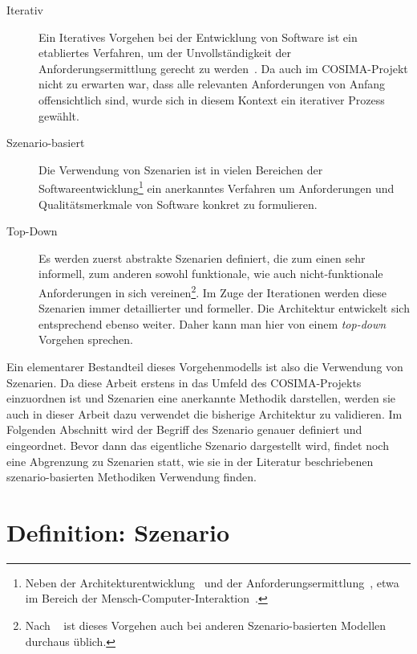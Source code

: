   \begin{description}
    \item[Iterativ] Ein Iteratives Vorgehen bei der Entwicklung von Software ist ein etabliertes Verfahren, um der Unvollständigkeit der Anforderungsermittlung gerecht zu werden~\citep{brooks1987nsb,basili2005iea,boehm1986sm,kruchten2003rup}. Da auch im COSIMA-Projekt nicht zu erwarten war, dass alle relevanten Anforderungen von Anfang offensichtlich sind, wurde sich in diesem Kontext ein iterativer Prozess gewählt.
    \item[Szenario-basiert] Die Verwendung von Szenarien ist in vielen Bereichen der Softwareentwicklung\footnote{Neben der Architekturentwicklung~\citep{software_architecture_in_practice,scenario_based_software_architecture_evaluation_methods} und der Anforderungsermittlung~\citep{weidenhaupt1998sus}, etwa im Bereich der Mensch-Computer-Interaktion~\cite{five_reasons_for_scenario_based_design}.} ein anerkanntes Verfahren um Anforderungen und Qualitätsmerkmale von Software konkret zu formulieren.
    \item[Top-Down] Es werden zuerst abstrakte Szenarien definiert, die zum einen sehr informell, zum anderen sowohl funktionale, wie auch nicht-funktionale Anforderungen in sich vereinen\footnote{Nach ~\citep[S. 42f]{weidenhaupt1998ssd} ist dieses Vorgehen auch bei anderen Szenario-basierten Modellen durchaus üblich.}. Im Zuge der Iterationen werden diese Szenarien immer detaillierter und formeller. Die Architektur entwickelt sich entsprechend ebenso weiter. Daher kann man hier von einem \emph{top-down} Vorgehen sprechen.
  \end{description}
  
  Ein elementarer Bestandteil dieses Vorgehenmodells ist also die Verwendung von Szenarien. Da diese Arbeit erstens in das Umfeld des COSIMA-Projekts einzuordnen ist und Szenarien eine anerkannte Methodik darstellen, werden sie auch in dieser Arbeit dazu verwendet die bisherige Architektur zu validieren. Im Folgenden Abschnitt wird der Begriff des Szenario genauer definiert und eingeordnet. Bevor dann das eigentliche Szenario dargestellt wird, findet noch eine Abgrenzung zu Szenarien statt, wie sie in der Literatur beschriebenen szenario-basierten Methodiken Verwendung finden.
  
\section{Definition: Szenario} %
\label{sec:definition_szenario}

